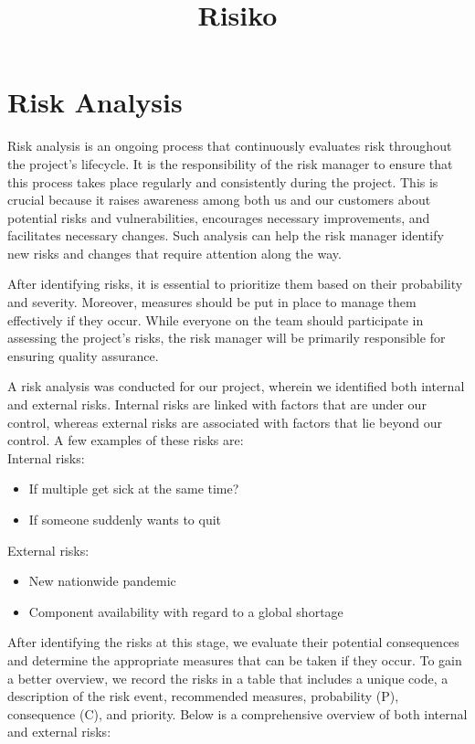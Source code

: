 \title{Risiko}

\section{Risk Analysis}

Risk analysis is an ongoing process that continuously evaluates risk throughout the project's lifecycle. It is the responsibility of the risk manager to ensure that this process takes place regularly and consistently during the project. This is crucial because it raises awareness among both us and our customers about potential risks and vulnerabilities, encourages necessary improvements, and facilitates necessary changes. Such analysis can help the risk manager identify new risks and changes that require attention along the way. \cite{Risk1}

After identifying risks, it is essential to prioritize them based on their probability and severity. Moreover, measures should be put in place to manage them effectively if they occur. While everyone on the team should participate in assessing the project's risks, the risk manager will be primarily responsible for ensuring quality assurance. \cite{Risk2}

A risk analysis was conducted for our project, wherein we identified both internal and external risks. Internal risks are linked with factors that are under our control, whereas external risks are associated with factors that lie beyond our control.\cite{RiskInternalExternal} A few examples of these risks are:\\



Internal risks:
\begin{itemize}
    \item If multiple get sick at the same time? 
    \item If someone suddenly wants to quit
\end{itemize}
External risks:
\begin{itemize}
    \item New nationwide pandemic
    \item Component availability with regard to a global shortage
\end{itemize}

After identifying the risks at this stage, we evaluate their potential consequences and determine the appropriate measures that can be taken if they occur. To gain a better overview, we record the risks in a table that includes a unique code, a description of the risk event, recommended measures, probability (P), consequence (C), and priority. Below is a comprehensive overview of both internal and external risks:


